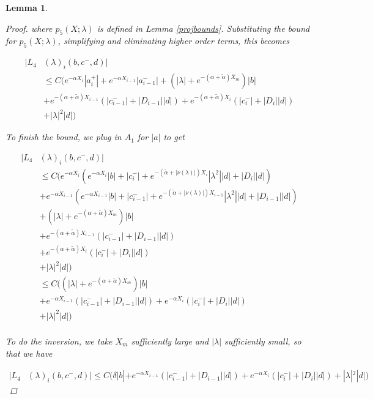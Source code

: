 \documentclass[12pt]{article}
\newtheorem{lemma}{Lemma}
\begin{document}
\begin{lemma}
\begin{proof}
where $p_5(X; \lambda)$ is defined in Lemma \ref{projbounds}. Substituting the bound for $p_5(X; \lambda)$, simplifying and eliminating higher order terms, this becomes

\begin{align*}
|L_4&(\lambda)_i(b, c^-, d)|\\ 
&\leq C \Big( e^{-\alpha X_i} |a_i^+| +  e^{-\alpha X_{i-1}} |a_{i-1}^-| +(|\lambda| + e^{-(\alpha + \tilde{\alpha}) X_m})|b| \\
&+ e^{-(\alpha + \tilde{\alpha}) X_{i-1}}( |c_{i-1}^-| + |D_{i-1}||d| ) 
+ e^{-(\alpha + \tilde{\alpha}) X_i}( |c_i^-| + |D_i||d| ) \\
&+ |\lambda|^2 |d| \Big)
\end{align*}

To finish the bound, we plug in $A_1$ for $|a|$ to get

\begin{align*}
|L_4&(\lambda)_i(b, c^-, d)|\\ 
&\leq C \Big( e^{-\alpha X_i} ( e^{-\alpha X_i} |b| + |c_i^-| + e^{-(\tilde{\alpha}+|\nu(\lambda)|) X_i} |\lambda^2| |d| + |D_i||d| ) \\
&+  e^{-\alpha X_{i-1}} ( e^{-\alpha X_{i-1}} |b| + |c_{i-1}^-| + e^{-(\tilde{\alpha}+|\nu(\lambda)|) X_{i-1}} |\lambda^2| |d| + |D_{i-1}||d| ) \\
&+(|\lambda| + e^{-(\alpha + \tilde{\alpha}) X_m})|b| \\
&+ e^{-(\alpha + \tilde{\alpha}) X_{i-1}}( |c_{i-1}^-| + |D_{i-1}||d| ) \\
&+ e^{-(\alpha + \tilde{\alpha}) X_i}( |c_i^-| + |D_i||d| ) \\
&+ |\lambda|^2 |d| \Big) \\
&\leq C \Big( 
(|\lambda| + e^{-(\alpha + \tilde{\alpha}) X_m})|b| \\
&+ e^{-\alpha X_{i-1}}( |c_{i-1}^-| + |D_{i-1}||d| ) 
+ e^{-\alpha X_i}( |c_i^-| + |D_i||d| ) \\
&+ |\lambda|^2 |d| \Big) \\
\end{align*}

To do the inversion, we take $X_m$ sufficiently large and $|\lambda|$ sufficiently small, so that we have

\begin{align*}
|L_4&(\lambda)_i(b, c^-, d)| \leq C \Big( 
\delta |b|
+ e^{-\alpha X_{i-1}}( |c_{i-1}^-| + |D_{i-1}||d| )
+ e^{-\alpha X_i}( |c_i^-| + |D_i||d| )
+ |\lambda|^2 |d| \Big)
\end{align*}


\end{proof}
\end{lemma}
\end{document}
